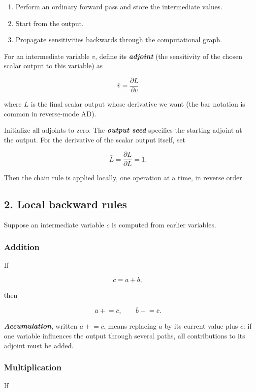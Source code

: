 \documentclass[10pt]{article}
\begin{document}
\begin{enumerate}
\item
Perform an ordinary forward pass and store the intermediate values.

\item
Start from the output.

\item
Propagate sensitivities backwards through the computational graph.

\end{enumerate}
For an intermediate variable $v$, define its \textbf{\textit{adjoint}} (the sensitivity of the chosen scalar output to this variable) as

\[
{
\bar v = \frac{\partial L}{\partial v}
}
\]

where $L$ is the final scalar output whose derivative we want (the bar notation is common in reverse-mode AD).

Initialize all adjoints to zero. The \textbf{\textit{output seed}} specifies the starting adjoint at the output. For the derivative of the scalar output itself, set

\[
\bar L
=
\frac{\partial L}{\partial L}
=1.
\]

Then the chain rule is applied locally, one operation at a time, in reverse order.

\subsection*{2. Local backward rules}
Suppose an intermediate variable $c$ is computed from earlier variables.

\subsubsection*{Addition}
If

\[
c=a+b,
\]

then

\[
\bar a \mathrel{+}= \bar c,
\qquad
\bar b \mathrel{+}= \bar c.
\]

\textbf{\textit{Accumulation}}, written $\bar a\mathrel{+}=\bar c$, means replacing $\bar a$ by its current value plus $\bar c$: if one variable influences the output through several paths, all contributions to its adjoint must be added.

\subsubsection*{Multiplication}
If
\end{document}
